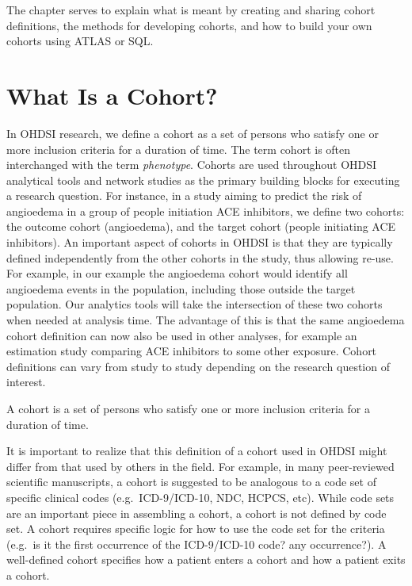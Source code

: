 \documentclass[11pt]{book}
\theoremstyle{definition}
\theoremstyle{definition}
\theoremstyle{definition}
\theoremstyle{remark}
\let\BeginKnitrBlock\begin \let\EndKnitrBlock\end
\begin{document}
The chapter serves to explain what is meant by creating and sharing
cohort definitions, the methods for developing cohorts, and how to build
your own cohorts using ATLAS or SQL.

\section{What Is a Cohort?}\label{what-is-a-cohort}

In OHDSI research, we define a cohort as a set of persons who satisfy
one or more inclusion criteria for a duration of time. The term cohort
is often interchanged with the term \emph{phenotype}. Cohorts are used
throughout OHDSI analytical tools and network studies as the primary
building blocks for executing a research question. For instance, in a
study aiming to predict the risk of angioedema in a group of people
initiation ACE inhibitors, we define two cohorts: the outcome cohort
(angioedema), and the target cohort (people initiating ACE inhibitors).
An important aspect of cohorts in OHDSI is that they are typically
defined independently from the other cohorts in the study, thus allowing
re-use. For example, in our example the angioedema cohort would identify
all angioedema events in the population, including those outside the
target population. Our analytics tools will take the intersection of
these two cohorts when needed at analysis time. The advantage of this is
that the same angioedema cohort definition can now also be used in other
analyses, for example an estimation study comparing ACE inhibitors to
some other exposure. Cohort definitions can vary from study to study
depending on the research question of interest.

\BeginKnitrBlock{rmdimportant}
A cohort is a set of persons who satisfy one or more inclusion criteria
for a duration of time.
\EndKnitrBlock{rmdimportant}

  It is important to realize that
this definition of a cohort used in OHDSI might differ from that used by
others in the field. For example, in many peer-reviewed scientific
manuscripts, a cohort is suggested to be analogous to a code set of
specific clinical codes (e.g.~ICD-9/ICD-10, NDC, HCPCS, etc). While code
sets are an important piece in assembling a cohort, a cohort is not
defined by code set. A cohort requires specific logic for how to use the
code set for the criteria (e.g.~is it the first occurrence of the
ICD-9/ICD-10 code? any occurrence?). A well-defined cohort specifies how
a patient enters a cohort and how a patient exits a cohort.
\end{document}
